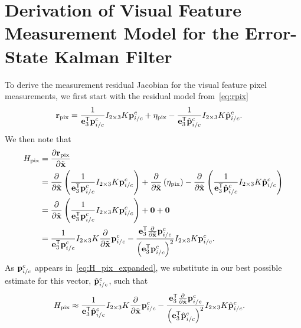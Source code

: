\chapter{Derivation of Visual Feature Measurement Model for the Error-State Kalman Filter}
\label{apdx:estimation_pixel_meas_model}

To derive the measurement residual Jacobian for the visual feature pixel measurements, we
first start with the residual model from~\eqref{eq:rpix}
\begin{align}
  \mathrm{\mathbf{r}}_{\text{pix}}
  &= \frac{1}{\mathrm{\mathbf{e}}_3^{\mathsf{T}} \mathrm{\mathbf{p}}_{i/c}^c} I_{2 \times 3} K
  \mathrm{\mathbf{p}}_{i/c}^c + \mathrm{\mathbf{\eta}}_{\text{pix}} - \frac{1}{\mathrm{\mathbf{e}}_3^{\mathsf{T}} \hat{\mathrm{\mathbf{p}}}_{i/c}^c} I_{2 \times 3} K
  \hat{\mathrm{\mathbf{p}}}_{i/c}^c.
\end{align}
We then note that
\begin{align}
  H_{\text{pix}} &= \frac{ \partial \mathrm{\mathbf{r}}_{\text{pix}} }{ \partial \tilde{\mathrm{\mathbf{x}}}
  } \\
         &= \frac{ \partial }{ \partial \tilde{\mathrm{\mathbf{x}}}}
         \left( \frac{1}{\mathrm{\mathbf{e}}_3^{\mathsf{T}} \mathrm{\mathbf{p}}_{i/c}^c} I_{2 \times 3} K
         \mathrm{\mathbf{p}}_{i/c}^c \right) + \frac{ \partial }{ \partial \tilde{\mathrm{\mathbf{x}}}}
         \left( \mathrm{\mathbf{\eta}}_{\text{pix}} \right) - \frac{ \partial }{ \partial
           \tilde{\mathrm{\mathbf{x}}}} \left( \frac{1}{\mathrm{\mathbf{e}}_3^{\mathsf{T}} \hat{\mathrm{\mathbf{p}}}_{i/c}^c} I_{2 \times 3} K
         \hat{\mathrm{\mathbf{p}}}_{i/c}^c \right) \\
         &= \frac{ \partial }{ \partial \tilde{\mathrm{\mathbf{x}}}}
         \left( \frac{1}{\mathrm{\mathbf{e}}_3^{\mathsf{T}} \mathrm{\mathbf{p}}_{i/c}^c} I_{2 \times 3} K
         \mathrm{\mathbf{p}}_{i/c}^c \right) + \mathrm{\mathbf{0}} + \mathrm{\mathbf{0}} \\
          &= 
         \frac{1}{\mathrm{\mathbf{e}}_3^{\mathsf{T}} \mathrm{\mathbf{p}}_{i/c}^c} I_{2 \times 3} K
         \frac{\partial}{\partial \tilde{\mathrm{\mathbf{x}}}} \mathrm{\mathbf{p}}_{i/c}^c 
         - \frac{\mathrm{\mathbf{e}}_3^{\mathsf{T}} \frac{\partial}{\partial \tilde{\mathrm{\mathbf{x}}}} 
         \mathrm{\mathbf{p}}_{i/c}^c}{\left( \mathrm{\mathbf{e}}_3^{\mathsf{T}}
         \mathrm{\mathbf{p}}_{i/c}^c \right)^2 } I_{2 \times 3} K
          \mathrm{\mathbf{p}}_{i/c}^c. 
          \label{eq:H_pix_expanded}
\end{align}
As $\mathrm{\mathbf{p}}_{i/c}^c$ appears in~\eqref{eq:H_pix_expanded}, we substitute in our
best possible estimate for this vector, $\hat{\mathrm{\mathbf{p}}}_{i/c}^c$, such that
\begin{align}
  H_{\text{pix}} 
  &\approx
  \frac{1}{\mathrm{\mathbf{e}}_3^{\mathsf{T}} \hat{\mathrm{\mathbf{p}}}_{i/c}^c} I_{2 \times 3} K
 \frac{\partial}{\partial \tilde{\mathrm{\mathbf{x}}}} \mathrm{\mathbf{p}}_{i/c}^c 
 - \frac{\mathrm{\mathbf{e}}_3^{\mathsf{T}} \frac{\partial}{\partial \tilde{\mathrm{\mathbf{x}}}} 
 \mathrm{\mathbf{p}}_{i/c}^c}{\left( \mathrm{\mathbf{e}}_3^{\mathsf{T}}
 \hat{\mathrm{\mathbf{p}}}_{i/c}^c \right)^2 } I_{2 \times 3} K
 \hat{\mathrm{\mathbf{p}}}_{i/c}^c. 
\end{align}

